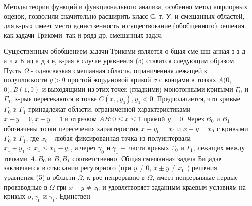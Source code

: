 \documentclass[10pt]{article}
\begin{document}
Методы теории функций и функционального анализа, особенно метод ашриорных оценок, позволили значительно расширить класс С. т. У. и смешанных областей, для к-рых имеет место единственность и существование (обобщенного) решения как задачи Трикоми, так и ряда др. смешанных задач.



Существенным обобщением задачи Трикоми является о бщая сме шш анная з а д а ч а Б иц а д з е, к-рая в случае уравнения (5) ставится следующим образом. Пусть $\Omega$ - односвязная смешанная область, ограниченная лежащей в полуплоскости $y>0$ простой жордановой кривой $\sigma$ с концами в точках $A(0$, $0), B(1,0)$ и выходящими из этих точек (гладкими) монотонными кривыми $\Gamma_{0}$ и $\Gamma_{1}$, к-рые пересекаются в точке $C\left(x_{1}, y_{1}\right), y_{1}<0$. Предполагается, что кривые $\Gamma_{0}$ и $\Gamma_{1}$ принадлежат области, ограниченной характеристиками $x+y=0, x-y=1$ и отрезком $A B: 0 \leqslant x \leqslant 1$ прямой $y=0$. Через $B_{0}$ и $B_{1}$ обозначены точки пересечения характеристик $x-y_{1}=x_{0}$ и $x+y=x_{0}$ с кривыми $\Gamma_{0}$ и $\Gamma_{1}$, где $x_{0}$ - любая фиксированная точка из полуинтервала $x_{1}+y_{1}<x_{1} \leqslant x_{1}-y_{1}$, а через $\gamma_{0}$ и $\gamma_{1}-$ части кривых $\Gamma_{0}$ и $\Gamma_{1}$, лежащих между точками $A, B_{0}$ и $B, B_{1}$ соответственно. Общая смешанная задача Бицадзе заключается в отыскании регулярного (при $y \neq 0$, $x \pm y \neq x_{0}$ ) решения уравнения (5) в области $\Omega$, к-рое непрерывно в $\bar{\Omega}$, имеет непрерывные первые производные в $\Omega$ гри $x \pm y \neq x_{0}$ и удовлетворяет заданным краевым условиям на кривых $\sigma, \gamma_{0}$ и $\gamma_{1}$. Единствен-
\end{document}
